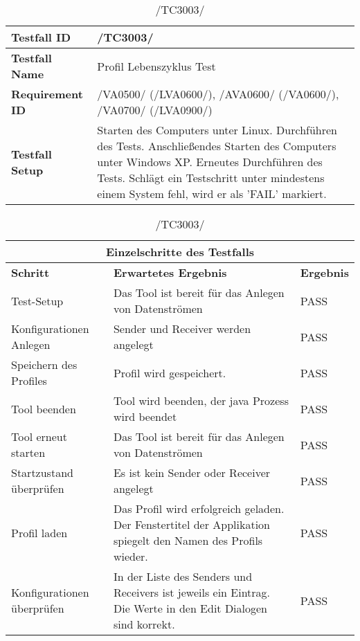 \begin{table}[h]
\caption{/TC3003/}
\label{tab:TC3003}
\begin{center}
\begin{tabular}{|p{3.5cm}|p{11cm}|}
\hline
\textbf{Testfall ID} & /TC3003/\\
\hline
\textbf{Testfall Name} & Profil Lebenszyklus Test\\
\hline
\textbf{Requirement ID} & /VA0500/ (/LVA0600/), /AVA0600/ (/VA0600/), /VA0700/ (/LVA0900/)\\
\hline
\textbf{Testfall Setup} & Starten des Computers unter Linux. Durchführen des Tests.
Anschließendes Starten des Computers unter Windows XP. Erneutes Durchführen des Tests. Schlägt ein Testschritt unter mindestens einem System fehl, wird er als 'FAIL' markiert.\\
\hline
\end{tabular}
\begin{tabular}{|p{4cm}|p{7.8cm}|p{2.3cm}|}
\multicolumn{3}{|c|}{\textbf{Einzelschritte des Testfalls}} \\
\hline
\textbf{Schritt} & \textbf{Erwartetes Ergebnis} & \textbf{Ergebnis}\\
\hline
                    Test-Setup &
                    Das Tool ist bereit für das Anlegen von Datenströmen &
                    PASS\\
                \hline
                    Konfigurationen Anlegen &
                    Sender und Receiver werden angelegt &
                    PASS\\
                \hline
                    Speichern des Profiles &
                    Profil wird gespeichert.&
                    PASS\\
                \hline
                    Tool beenden &
                    Tool wird beenden, der java Prozess wird beendet &
                    PASS\\
                \hline
                    Tool erneut starten & 
                    Das Tool ist bereit für das Anlegen von Datenströmen &
                    PASS\\
                \hline
                    Startzustand überprüfen & 
                    Es ist kein Sender oder Receiver angelegt &
                    PASS\\
                \hline
                    Profil laden & 
                    Das Profil wird erfolgreich geladen. Der Fenstertitel der 
                    Applikation spiegelt den Namen des Profils wieder. &
                    PASS\\
                 \hline
                    Konfigurationen überprüfen & 
                    In der Liste des Senders und Receivers ist jeweils ein Eintrag.
                    Die Werte in den Edit Dialogen sind korrekt. &
                    PASS\\
\hline
\end{tabular}


\end{center}
\end{table}
